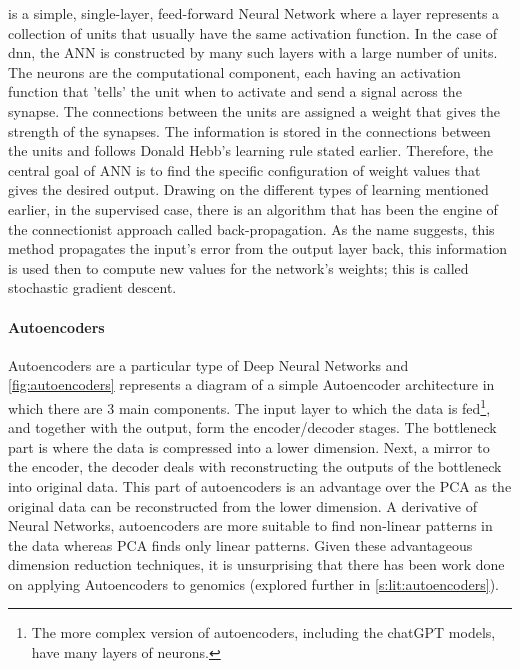  is a simple, single-layer, feed-forward Neural Network where a layer represents a collection of units that usually have the same activation function. In the case of \acrfull{dnn}, the ANN is constructed by many such layers with a large number of units. The neurons are the computational component, each having an activation function that 'tells' the unit when to activate and send a signal across the synapse. The connections between the units are assigned a weight that gives the strength of the synapses. The information is stored in the connections between the units and follows Donald Hebb's learning rule stated earlier. Therefore, the central goal of ANN is to find the specific configuration of weight values that gives the desired output. Drawing on the different types of learning mentioned earlier, in the supervised case, there is an algorithm that has been the engine of the connectionist approach called back-propagation. As the name suggests, this method propagates the input's error from the output layer back, this information is used then to compute new values for the network's weights; this is called stochastic gradient descent.

\paragraph*{Autoencoders} \label{s:lit:autoencod_overview}

Autoencoders are a particular type of Deep Neural Networks and \cref{fig:autoencoders} represents a diagram of a simple Autoencoder architecture in which there are 3 main components. The input layer to which the data is fed\footnote{The more complex version of autoencoders, including the chatGPT models, have many layers of neurons.}, and together with the output, form the encoder/decoder stages. The bottleneck part is where the data is compressed into a lower dimension. Next, a mirror to the encoder, the decoder deals with reconstructing the outputs of the bottleneck into original data. This part of autoencoders is an advantage over the PCA as the original data can be reconstructed from the lower dimension. A derivative of Neural Networks, autoencoders are more suitable to find non-linear patterns in the data whereas PCA finds only linear patterns. Given these advantageous dimension reduction techniques, it is unsurprising that there has been work done on applying Autoencoders to genomics (explored further in \cref{s:lit:autoencoders}).

